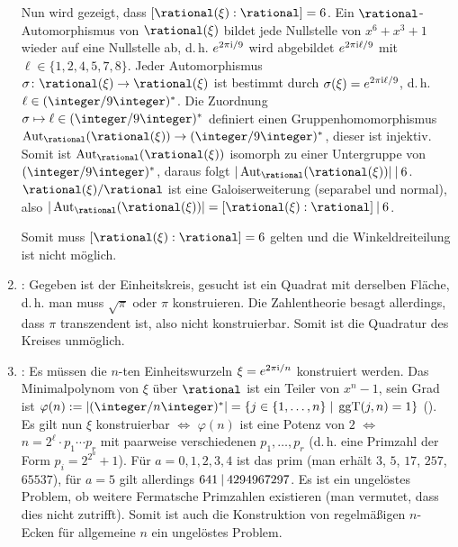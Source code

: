 \begin{Bem}
\begin{enumerate}
        Nun wird gezeigt, dass $[\rational(\xi):\rational] = 6$.
        Ein $\rational$-Automorphismus von $\rational(\xi)$ bildet
        jede Nullstelle von $x^6 + x^3 + 1$ wieder auf eine Nullstelle
        ab, d.\,h. $e^{2\pi\text{i}/9}$ wird abgebildet
        $e^{2\pi\text{i}\ell/9}$ mit $\ell \in \{1, 2, 4, 5, 7, 8\}$.
        Jeder Automorphismus
        $\sigma\colon \rational(\xi) \rightarrow \rational(\xi)$ ist bestimmt
        durch $\sigma(\xi) = e^{2\pi\text{i}\ell/9}$, d.\,h.
        $\ell \in (\integer/9\integer)^\ast$.
        Die Zuordnung $\sigma \mapsto \ell \in (\integer/9\integer)^\ast$
        definiert einen Gruppenhomomorphismus
        $\Aut_\rational(\rational(\xi)) \rightarrow (\integer/9\integer)^\ast$,
        dieser ist injektiv.
        Somit ist $\Aut_\rational(\rational(\xi))$ isomorph zu einer
        Untergruppe von $(\integer/9\integer)^\ast$,
        daraus folgt $|\Aut_\rational(\rational(\xi))| \teilt 6$.
        $\rational(\xi)/\rational$ ist eine Galoiserweiterung
        (separabel und normal), also
        $|\Aut_\rational(\rational(\xi))| =
        [\rational(\xi):\rational] \teilt 6$.
        
        Somit muss $[\rational(\xi):\rational] = 6$ gelten und
        die Winkeldreiteilung ist nicht möglich.
        
        \item
        :
        Gegeben ist der Einheitskreis,
        gesucht ist ein Quadrat mit derselben Fläche, d.\,h.
        man muss $\sqrt{\pi}$ oder $\pi$ konstruieren.
        Die Zahlentheorie besagt allerdings, dass $\pi$ transzendent ist,
        also nicht konstruierbar.
        Somit ist die Quadratur des Kreises unmöglich.
        
        \item
        :
        Es müssen die $n$-ten Einheitswurzeln $\xi = e^{2\pi\text{i}/n}$
        konstruiert werden.
        Das Minimalpolynom von $\xi$ über $\rational$ ist ein Teiler von
        $x^n - 1$, sein Grad ist $\varphi(n) := |(\integer/n\integer)^\ast| =
        \{j \in \{1, \dotsc, n\} \;|\; \ggT(j, n) = 1\}$
        ().
        Es gilt nun $\xi$ konstruierbar $\iff$
        $\varphi(n)$ ist eine Potenz von $2$ $\iff$
        $n = 2^\ell \cdot p_1 \dotsm p_r$ mit
        paarweise verschiedenen 
        $p_1, \dotsc, p_r$
        (d.\,h. eine Primzahl der Form $p_i = 2^{2^a} + 1$).
        Für $a = 0, 1, 2, 3, 4$ ist das prim
        (man erhält $3$, $5$, $17$, $257$, $65537$),
        für $a = 5$ gilt allerdings $641 \mathbin{|} 4294967297$.
        Es ist ein ungelöstes Problem, ob weitere Fermatsche Primzahlen
        existieren
        (man vermutet, dass dies nicht zutrifft).
        Somit ist auch die Konstruktion von regelmäßigen $n$-Ecken
        für allgemeine $n$ ein ungelöstes Problem.
    \end{enumerate}
\end{Bem}

